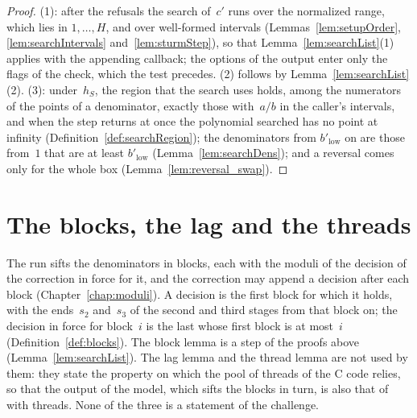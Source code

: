 \begin{proof}
  \leanok
  (1): after the refusals the search of~$c'$ runs over the normalized range, which lies in
  $1, \dots, H$, and over well-formed intervals (Lemmas~\ref{lem:setupOrder},
  \ref{lem:searchIntervals} and~\ref{lem:sturmStep}), so that Lemma~\ref{lem:searchList}(1) applies
  with the appending callback; the options of the output enter only the flags of the check, which
  the test precedes. (2) follows by Lemma~\ref{lem:searchList}(2). (3): under~$h_S$, the region that
  the search uses holds, among the numerators of the points of a denominator, exactly those
  with~$a/b$ in the caller's intervals, and when the step returns at once the polynomial searched
  has no point at infinity (Definition~\ref{def:searchRegion}); the denominators from
  $b'_{\mathrm{low}}$ on are those from~$1$ that are at least $b'_{\mathrm{low}}$
  (Lemma~\ref{lem:searchDens}); and a reversal comes only for the whole box
  (Lemma~\ref{lem:reversal_swap}).
\end{proof}

\section{The blocks, the lag and the threads}\label{sec:theoremsBlocks}

The run sifts the denominators in blocks, each with the moduli of the decision of the correction in
force for it, and the correction may append a decision after each block (Chapter~\ref{chap:moduli}).
A decision is the first block for which it holds, with the ends~$s_2$ and~$s_3$ of the second and
third stages from that block on; the decision in force for block~$i$ is the last whose first block
is at most~$i$ (Definition~\ref{def:blocks}). The block lemma is a step of the proofs above
(Lemma~\ref{lem:searchList}). The lag lemma and the thread lemma are not used by them: they state
the property on which the pool of threads of the C code relies, so that the output of the model,
which sifts the blocks in turn, is also that of \ratpoints{} with threads. None of the three is a
statement of the challenge.

